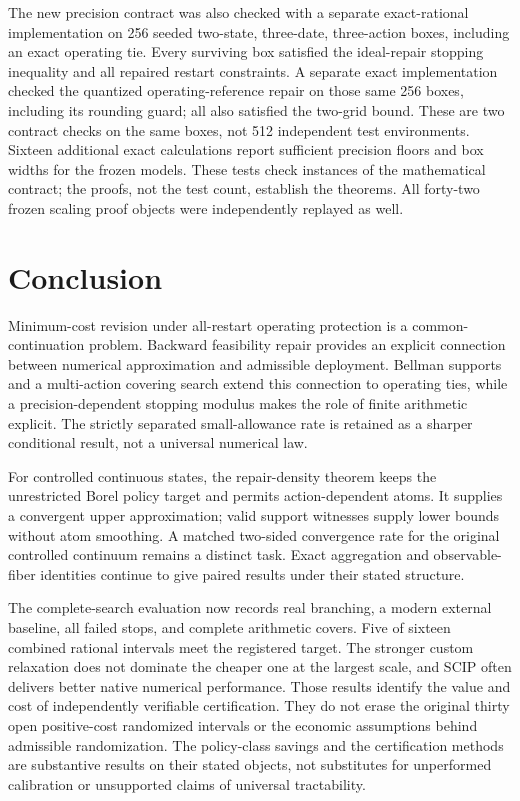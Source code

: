 The new precision contract was also checked with a separate exact-rational implementation on 256 seeded two-state, three-date, three-action boxes, including an exact operating tie. Every surviving box satisfied the ideal-repair stopping inequality and all repaired restart constraints. A separate exact implementation checked the quantized operating-reference repair on those same 256 boxes, including its rounding guard; all also satisfied the two-grid bound. These are two contract checks on the same boxes, not 512 independent test environments. Sixteen additional exact calculations report sufficient precision floors and box widths for the frozen models. These tests check instances of the mathematical contract; the proofs, not the test count, establish the theorems. All forty-two frozen scaling proof objects were independently replayed as well.

\section{Conclusion}\label{sec:conclusion45}
Minimum-cost revision under all-restart operating protection is a common-continuation problem. Backward feasibility repair provides an explicit connection between numerical approximation and admissible deployment. Bellman supports and a multi-action covering search extend this connection to operating ties, while a precision-dependent stopping modulus makes the role of finite arithmetic explicit. The strictly separated small-allowance rate is retained as a sharper conditional result, not a universal numerical law.

For controlled continuous states, the repair-density theorem keeps the unrestricted Borel policy target and permits action-dependent atoms. It supplies a convergent upper approximation; valid support witnesses supply lower bounds without atom smoothing. A matched two-sided convergence rate for the original controlled continuum remains a distinct task. Exact aggregation and observable-fiber identities continue to give paired results under their stated structure.

The complete-search evaluation now records real branching, a modern external baseline, all failed stops, and complete arithmetic covers. Five of sixteen combined rational intervals meet the registered target. The stronger custom relaxation does not dominate the cheaper one at the largest scale, and SCIP often delivers better native numerical performance. Those results identify the value and cost of independently verifiable certification. They do not erase the original thirty open positive-cost randomized intervals or the economic assumptions behind admissible randomization. The policy-class savings and the certification methods are substantive results on their stated objects, not substitutes for unperformed calibration or unsupported claims of universal tractability.
